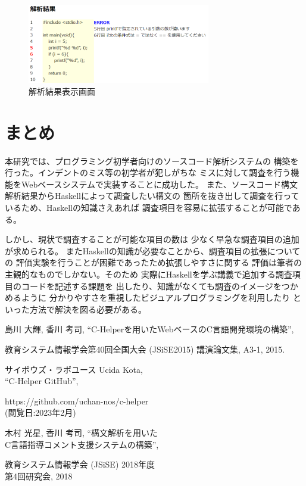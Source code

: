 \documentclass[11pt,twocolumn]{jarticle}
\begin{document}
\begin{figure}[!h]
   \begin{center}
      \includegraphics[width=8cm]{systempage2.png}
      \caption{解析結果表示画面}
      \label{fig:sys2}
   \end{center}
\end{figure}

\section{まとめ}
本研究では、プログラミング初学者向けのソースコード解析システムの
構築を行った。インデントのミス等の初学者が犯しがちな
ミスに対して調査を行う機能をWebベースシステムで実装することに成功した。
また、ソースコード構文解析結果からHaskellによって調査したい構文の
箇所を抜き出して調査を行っているため、Haskellの知識さえあれば
調査項目を容易に拡張することが可能である。

しかし、現状で調査することが可能な項目の数は
少なく早急な調査項目の追加が求められる。
またHaskellの知識が必要なことから、調査項目の拡張についての
評価実験を行うことが困難であったため拡張しやすさに関する
評価は筆者の主観的なものでしかない。そのため
実際にHaskellを学ぶ講義で追加する調査項目のコードを記述する課題を
出したり、知識がなくても調査のイメージをつかめるように
分かりやすさを重視したビジュアルプログラミングを利用したり
といった方法で解決を図る必要がある。


\begin{thebibliography}{9}
%
島川 大輝, 香川 考司, ``C-Helperを用いたWebベースのC言語開発環境の構築'',

教育システム情報学会第40回全国大会 (JSiSE2015) 講演論文集, A3-1, 2015.

サイボウズ・ラボユース Ucida Kota, \\ ``C-Helper GitHub'',

https://github.com/uchan-nos/c-helper \\ (閲覧日:2023年2月)

木村 光星, 香川 考司, ``構文解析を用いた\\C言語指導コメント支援システムの構築'',

教育システム情報学会 (JSiSE) 2018年度 \\ 第4回研究会, 2018

\end{thebibliography}
\end{document}
